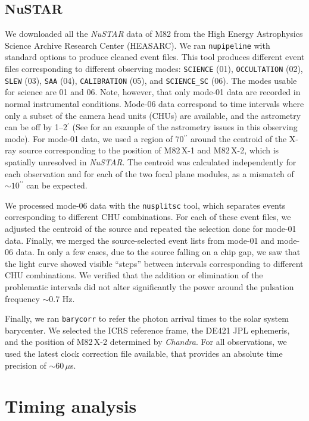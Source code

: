 \documentclass[twocolumn]{aastex631}
\newcommand{\chandra}{{\it Chandra}\xspace}
\newcommand{\nustar}{\textit{NuSTAR}\xspace}
\newcommand{\Mone}{M82\,X-1\xspace}
\newcommand{\Mtwo}{M82\,X-2\xspace}
\newcommand{\asec}{\ensuremath{^{\prime\prime}}}
\newcommand{\amin}{\ensuremath{^{\prime}}}
\begin{document}
\subsection{NuSTAR}
We downloaded all the \nustar data of M82 from the High Energy Astrophysics Science Archive Research Center (HEASARC).
We ran \texttt{nupipeline} with standard options to produce cleaned event files.
This tool produces different event files corresponding to different observing modes: \texttt{SCIENCE} (01), \texttt{OCCULTATION} (02), \texttt{SLEW} (03), \texttt{SAA} (04), \texttt{CALIBRATION} (05), and \texttt{SCIENCE\_SC} (06).
The modes usable for science are 01 and 06.
Note, however, that only mode-01 data are recorded in normal instrumental conditions. Mode-06 data correspond to time intervals where only a subset of the camera head units (CHUs) are available, and the astrometry can be off by 1--2$\amin$ (See \citealt{waltonSoftStateCygnus2016} for an example of the astrometry issues in this observing mode).
For mode-01 data, we used a region of 70$\asec$ around the centroid of the X-ray source corresponding to the position of \Mone and \Mtwo, which is spatially unresolved in \nustar.
The centroid was calculated independently for each observation and for each of the two focal plane modules, as a mismatch of $\sim10\asec$ can be expected.

We processed mode-06 data with the \texttt{nusplitsc} tool, which separates events corresponding to different CHU combinations. For each of these event files, we adjusted the centroid of the source and repeated the selection done for mode-01 data.
Finally, we merged the source-selected event lists from mode-01 and mode-06 data.
In only a few cases, due to the source falling on a chip gap, we saw that the light curve showed visible ``steps'' between intervals corresponding to different CHU combinations.
We verified that the addition or elimination of the problematic intervals did not alter significantly the power around the pulsation frequency $\sim$0.7 Hz.

Finally, we ran \texttt{barycorr} to refer the photon arrival times to the solar system barycenter.
We selected the ICRS reference frame, the DE421 JPL ephemeris, and the position of \Mtwo determined by \chandra.
For all observations, we used the latest clock correction file available, that provides an absolute time precision of $\sim60\,\mu$s.

\section{Timing analysis}\label{sec:timing}
\end{document}
